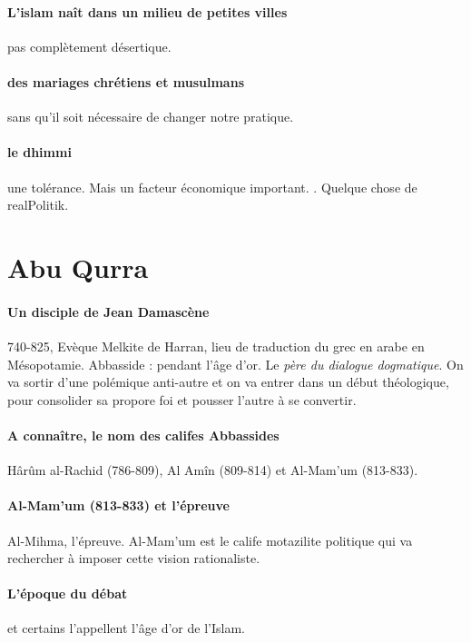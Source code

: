 \paragraph{L'islam naît dans un milieu de petites villes} pas complètement désertique.


\paragraph{des mariages chrétiens et musulmans} sans qu'il soit nécessaire de changer notre pratique. 


\paragraph{le dhimmi} une tolérance. Mais un facteur économique important. . Quelque chose de realPolitik. 



\section{Abu Qurra}


\paragraph{Un disciple de Jean Damascène} 740-825, Evèque Melkite de Harran, lieu de traduction du grec en arabe en Mésopotamie. Abbasside : pendant l'âge d'or.  Le \textit{père du dialogue dogmatique}. On va sortir d'une polémique anti-autre et on va entrer dans un début théologique, pour consolider sa propore foi et pousser l'autre à se convertir. 

\paragraph{A connaître, le nom des califes Abbassides} Hârûm al-Rachid (786-809), Al Amîn (809-814) et Al-Mam'um (813-833). 

\paragraph{Al-Mam'um (813-833) et l'épreuve} Al-Mihma, l'épreuve. Al-Mam'um est le calife motazilite politique qui va rechercher à imposer cette vision rationaliste.

\paragraph{L'époque du débat} et certains l'appellent l'âge d'or de l'Islam. 


